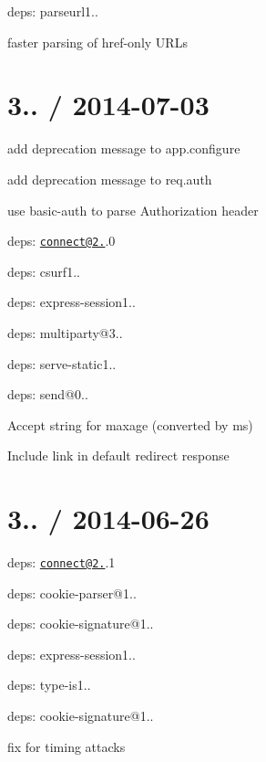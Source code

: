{\ttfamily deps\+: parseurl1..
\begin{DoxyItemize}
\item faster parsing of href-\/only U\+R\+Ls
\end{DoxyItemize}}

{\ttfamily \section*{3.. / 2014-\/07-\/03 }}

{\ttfamily }

{\ttfamily 
\begin{DoxyItemize}
\item add deprecation message to {\ttfamily app.\+configure}
\item add deprecation message to {\ttfamily req.\+auth}
\item use {\ttfamily basic-\/auth} to parse {\ttfamily Authorization} header
\item deps\+: \href{mailto:connect@2.22}{\tt connect@2.}.0
\begin{DoxyItemize}
\item deps\+: csurf1..
\item deps\+: express-\/session1..
\item deps\+: multiparty@3..
\item deps\+: serve-\/static1..
\end{DoxyItemize}
\item deps\+: send@0..
\begin{DoxyItemize}
\item Accept string for {\ttfamily maxage} (converted by {\ttfamily ms})
\item Include link in default redirect response
\end{DoxyItemize}
\end{DoxyItemize}}

{\ttfamily \section*{3.. / 2014-\/06-\/26 }}

{\ttfamily }

{\ttfamily 
\begin{DoxyItemize}
\item deps\+: \href{mailto:connect@2.21}{\tt connect@2.}.1
\begin{DoxyItemize}
\item deps\+: cookie-\/parser@1..
\item deps\+: cookie-\/signature@1..
\item deps\+: express-\/session1..
\item deps\+: type-\/is1..
\end{DoxyItemize}
\item deps\+: cookie-\/signature@1..
\begin{DoxyItemize}
\item fix for timing attacks
\end{DoxyItemize}
\end{DoxyItemize}}


